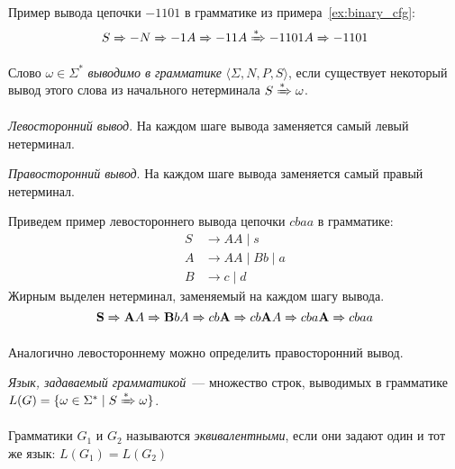 \begin{example}
    Пример вывода цепочки $-1101$ в грамматике из примера~\ref{ex:binary_cfg}:
    \[
        S \derives[] - N \derives[] - 1 A \derives[] - 1 1 A \derives - 1 1 0 1 A \derives[] - 1 1 0 1
    \]
\end{example}

\begin{definition}
    Слово $\omega \in \Sigma^*$ \emph{выводимо в грамматике} $\langle \Sigma, N, P, S \rangle$, если существует некоторый вывод этого слова из начального нетерминала $S \derives \omega$.

\end{definition}

\begin{definition}
    \emph{Левосторонний вывод}. На каждом шаге вывода заменяется самый левый нетерминал.
\end{definition}

\begin{definition}
    \emph{Правосторонний вывод}. На каждом шаге вывода заменяется самый правый нетерминал.
\end{definition}

\begin{example}
    Приведем пример левостороннего вывода цепочки $cbaa$ в грамматике:
    \begin{align*}
        S & \rightarrow A A \mid s          \\
        A & \rightarrow A A \mid B b \mid a \\
        B & \rightarrow c \mid d
    \end{align*}
    Жирным выделен нетерминал, заменяемый на каждом шагу вывода.
    \[ \mathbf{S} \derives[] \mathbf{A} A \derives[] \mathbf{B} b A \derives[] c b \mathbf{A} \derives[] c b \mathbf{A} A \derives[] c b a \mathbf{A} \derives[] c b a a \]
\end{example}

Аналогично левостороннему можно определить правосторонний вывод.

\begin{definition}[Язык]
    \emph{Язык, задаваемый грамматикой}~--- множество строк, выводимых в грамматике $L(G) = \{ \omega \in \Sigma^* \mid S \derives \omega \}$.
\end{definition}

\begin{definition}
    Грамматики $G_1$ и $G_2$ называются \emph{эквивалентными}, если они задают один и тот же язык: $L(G_1) = L(G_2)$
\end{definition}

